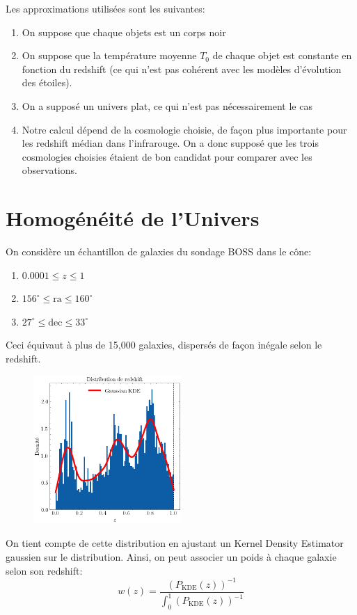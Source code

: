 \documentclass{article}
\numberwithin{equation}{section}
\begin{document}
Les approximations utilisées sont les suivantes:
\begin{enumerate}
        \item On suppose que chaque objets est un corps noir
        \item On suppose que la température moyenne $T_0$ de chaque objet est constante 
                en fonction du redshift (ce qui n'est pas cohérent avec les modèles d'évolution 
                des étoiles).
        \item On a supposé un univers plat, ce qui n'est pas nécessairement le cas
        \item Notre calcul dépend de la cosmologie choisie, de façon plus importante pour 
                les redshift médian dans l'infrarouge. On a donc supposé que les trois cosmologies 
                choisies étaient de bon candidat pour comparer avec les observations.
        
\end{enumerate}



\section{Homogénéité de l'Univers}
On considère un échantillon de galaxies du sondage BOSS dans le cône:
\begin{enumerate}
        \item $0.0001 \leq z \leq 1$
        \item $156^{\circ} \leq \text{ra} \leq 160^{\circ}$
        \item $27^{\circ} \leq \text{dec} \leq 33^{\circ}$
\end{enumerate}
Ceci équivaut à plus de 15,000 galaxies, dispersés de façon inégale selon le redshift.
\begin{figure}[H]
        \centering
        \includegraphics[width=0.5\textwidth]{redshift_dist}
        \caption{}
        \label{fig:RedshiftDist}
\end{figure}
On tient compte de cette distribution en ajustant un Kernel Density Estimator gaussien
sur le distribution. Ainsi, on peut associer un poids à chaque galaxie selon son redshift:
\begin{equation}\label{eq:poids} 
        w(z) = \frac{(P_{\text{KDE}}(z))^{-1}}{\displaystyle\int_0^{1}(P_\text{KDE}(z))^{-1}}
\end{equation} 
\end{document}

